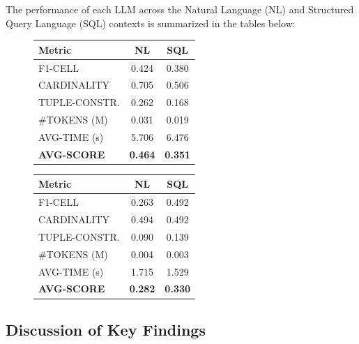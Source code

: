The performance of each LLM across the Natural Language (NL) and Structured Query Language (SQL) contexts is summarized in the tables below:

\begin{figure}[H]
    \centering
    \begin{minipage}[t]{0.49\textwidth}
        \centering
        \label{tab:gemini_results}
        \begin{tabular}{lcc}
            \toprule
            \textbf{Metric} & \textbf{NL} & \textbf{SQL} \\
            \midrule
            F1-CELL & 0.424 & 0.380 \\
            CARDINALITY & 0.705 & 0.506 \\
            TUPLE-CONSTR. & 0.262 & 0.168 \\
            \#TOKENS (M) & 0.031 & 0.019 \\
            AVG-TIME (s) & 5.706 & 6.476 \\
            \textbf{AVG-SCORE} & \textbf{0.464} & \textbf{0.351} \\
            \bottomrule
        \end{tabular}
    \end{minipage}
    \hfill
    \begin{minipage}[t]{0.49\textwidth}
        \centering
        \label{tab:watsonx_results}
        \begin{tabular}{lcc}
            \toprule
            \textbf{Metric} & \textbf{NL} & \textbf{SQL} \\
            \midrule
            F1-CELL & 0.263 & 0.492 \\
            CARDINALITY & 0.494 & 0.492 \\
            TUPLE-CONSTR. & 0.090 & 0.139 \\
            \#TOKENS (M) & 0.004 & 0.003 \\
            AVG-TIME (s) & 1.715 & 1.529 \\
            \textbf{AVG-SCORE} & \textbf{0.282} & \textbf{0.330} \\
            \bottomrule
        \end{tabular}
    \end{minipage}
\end{figure}

\vspace{2em}
\subsection{Discussion of Key Findings}

